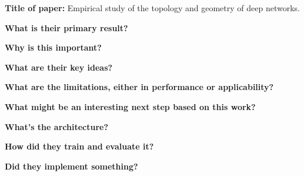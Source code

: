 \noindent \textbf{\large Title of paper: } Empirical study of the topology and
geometry of deep networks.

\noindent\textbf{\large What is their primary result?}
 
\noindent\textbf{\large Why is this important?}

\noindent\textbf{\large What are their key ideas?}

\noindent\textbf{\large What are the limitations, either in performance or applicability?}

\noindent\textbf{\large What might be an interesting next step based on this work?}

\noindent\textbf{\large What's the architecture?}

\noindent\textbf{\large How did they train and evaluate it?}

\noindent\textbf{\large Did they implement something?}

